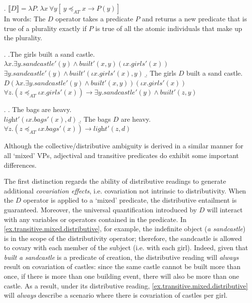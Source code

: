 \documentclass[a4paper, 11pt]{article}
\begin{document}
\ex. \label{doperator} $ \llbracket D \rrbracket = \lambda P.  \ \lambda x \ \forall y[\ y \preceq_{AT} x \rightarrow P(y)]$ \\
In words: The $D$ operator takes a predicate $P$ and returns a new predicate that is true of a plurality exactly if $P$ is true of all the atomic individuals that make up the plurality. 

\ex.  \label{ex.transitive.mixed.LF}
	\a.The girls built a sand castle.\\
    $\lambda x.\exists y.\mathit{sand castle}'(y) \wedge \textit{built}'(x,y)(\iota x.\mathit{girls}'(x))$\\
        $\exists y.\mathit{sandcastle}'(y) \wedge \textit{built}'(\iota x.\mathit{girls}'(x),y)$
        \b. The girls $D$ built a sand castle.\label{ex.transitive.mixed.distributive} \\ 
    $D(\lambda x.\exists y.\mathit{sandcastle}'(y) \wedge \textit{built}'(x,y))(\iota x.\mathit{girls}'(x))$\\
    $\forall z . (z\preceq_{AT}\iota x.\mathit{girls}'(x)) \rightarrow \exists y.\mathit{sand castle}'(y) \wedge \textit{built}'(z,y)$
    
    \ex. \label{ex.adjectival.mixed.LF}
\a. The bags are heavy.\\
 $ \textit{light}'(\iota x.\mathit{bags}'(x),d)$
\b. The bags $D$ are heavy.\\
    $\forall z. (z \preceq_{AT}\iota x.\mathit{bags}'(x)) \rightarrow  \textit{light}'(z,d)$

Although the collective/distributive ambiguity is derived in a similar manner for all `mixed' VPs, adjectival and transitive predicates do exhibit some important differences. \vspace{0.5cm}

The first distinction regards the ability of distributive readings to generate additional \emph{covariation effects}, i.e. covariation not intrinsic to distributivity. When the $D$ operator is applied to a `mixed' predicate, the distributive entailment is guaranteed. Moreover, the universal quantification introduced by $D$ will interact with any variables or operators contained in the predicate.
In \ref{ex.transitive.mixed.distributive}, for example, the indefinite object (\textit{a sandcastle}) is in the scope of the distributivity operator; therefore, the sandcastle is allowed to covary with each member of the subject (i.e. with each girl). 
Indeed, given that \textit{built a sandcastle} is a predicate of creation, the distributive reading will \emph{always} result on covariation of castles: since the same castle cannot be built more than once, if there is more than one building event, there will also be more than one castle. As a result, under its distributive reading, \ref{ex.transitive.mixed.distributive} will \emph{always} describe a scenario where there is covariation of castles per girl. 
\end{document}
